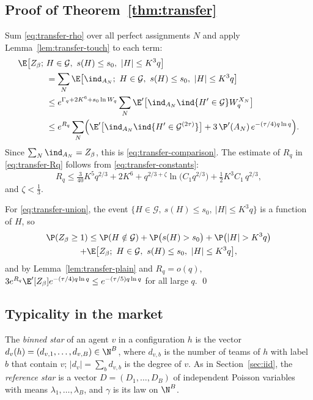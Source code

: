 \subsection{Proof of Theorem~\ref{thm:transfer}}\label{sec:transfer-proofT}

Sum \eqref{eq:transfer-rho} over all perfect assignments $N$ and apply
Lemma~\ref{lem:transfer-touch} to each term:
\begin{align*}
\E\bigl[Z_\beta;\ &H\in\mathcal G,\ s(H)\le s_0,\ |H|\le K^3q\bigr]\\
&=\sum_N\E\bigl[\ind_{A_N};\ H\in\mathcal G,\ s(H)\le s_0,\ |H|\le K^3q\bigr]\\
&\le e^{\Gamma_q+2K^6+s_0\ln W_q}\sum_N\E'\bigl[\ind_{A_N}\ind\{H'\in\mathcal G\}W_q^{X_N}\bigr]\\
&\le e^{R_q}\sum_N\Bigl(\E'\bigl[\ind_{A_N}\ind\{H'\in\mathcal G^{(2\tau)}\}\bigr]
+3\,\P'(A_N)\,e^{-(\tau/4)q\ln q}\Bigr).
\end{align*}
Since $\sum_N\ind_{A_N}=Z_\beta$, this is \eqref{eq:transfer-comparison}. The estimate of $R_q$
in \eqref{eq:transfer-Rq} follows from \eqref{eq:transfer-constants}:
\begin{equation}\label{eq:transfer-Rq-explicit}
R_q\le\tfrac{3}{40}K^5q^{2/3}+2K^6+q^{2/3+\zeta}\ln\bigl(C_1q^{2/3}\bigr)+\tfrac12K^3C_1\,q^{2/3},
\end{equation}
and $\zeta<\tfrac13$.

For \eqref{eq:transfer-union}, the event $\{H\in\mathcal G,\ s(H)\le s_0,\ |H|\le K^3q\}$ is a
function of $H$, so
\begin{multline*}
\P(Z_\beta\ge1)\le\P(H\notin\mathcal G)+\P\bigl(s(H)>s_0\bigr)+\P\bigl(|H|>K^3q\bigr)\\
+\E\bigl[Z_\beta;\ H\in\mathcal G,\ s(H)\le s_0,\ |H|\le K^3q\bigr],
\end{multline*}
and by Lemma~\ref{lem:transfer-plain} and $R_q=o(q)$,
$3e^{R_q}\E'[Z_\beta]e^{-(\tau/4)q\ln q}\le e^{-(\tau/5)q\ln q}$ for all large $q$. \qed

\subsection{Typicality in the market}\label{sec:transfer-typical}

The \emph{binned star} of an agent $v$ in a configuration $h$ is the vector
$d_v(h)=(d_{v,1},\dots,d_{v,B})\in\N^B$, where $d_{v,b}$ is the number of teams of $h$ with
label $b$ that contain $v$; $|d_v|=\sum_bd_{v,b}$ is the degree of $v$. As in
Section~\ref{sec:iid}, the \emph{reference star} is a vector $D=(D_1,\dots,D_B)$ of
independent Poisson variables with means $\lambda_1,\dots,\lambda_B$, and $\gamma$ is its law
on $\N^B$.

